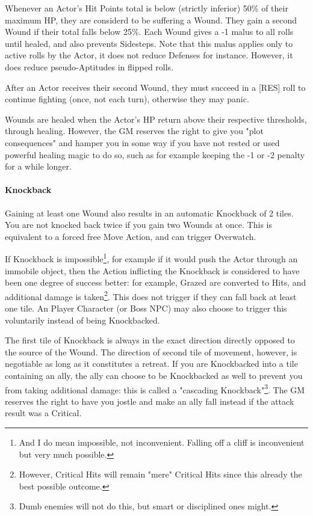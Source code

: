 Whenever an Actor's Hit Points total is below (strictly inferior) 50\% of their maximum HP, they are considerd to be suffering a Wound. They gain a second Wound if their total falls below 25\%. Each Wound gives a -1 malus to all rolls until healed, and also prevents Sidesteps. Note that this malus applies only to active rolls by the Actor, it does not reduce Defenses for instance. However, it does reduce pseudo-Aptitudes in flipped rolls.

After an Actor receives their second Wound, they must succeed in a [RES] roll to continue fighting (once, not each turn), otherwise they may panic. 

Wounds are healed when the Actor's HP return above their respective thresholds, through healing. However, the GM reserves the right to give you "plot consequences" and hamper you in some way if you have not rested or used powerful healing magic to do so, such as for example keeping the -1 or -2 penalty for a while longer.

\paragraph{Knockback}

Gaining at least one Wound also results in an automatic Knockback of 2 tiles. You are not knocked back twice if you gain two Wounds at once. This is equivalent to a forced free Move Action, and can trigger Overwatch. 

If Knockback is impossible\footnote{And I do mean impossible, not inconvenient. Falling off a cliff is inconvenient but very much possible.}, for example if it would push the Actor through an immobile object, then the Action inflicting the Knockback is considered to have been one degree of success better: for example, Grazed are converted to Hits, and additional damage is taken\footnote{However, Critical Hits will remain "mere" Critical Hits since this already the best possible outcome.}. This does not trigger if they can fall back at least one tile. An Player Character (or Boss NPC) may also choose to trigger this voluntarily instead of being Knockbacked.

The first tile of Knockback is always in the exact direction directly opposed to the source of the Wound. The direction of second tile of movement, however, is negotiable as long as it constitutes a retreat. If you are Knockbacked into a tile containing an ally, the ally can choose to be Knockbacked as well to prevent you from taking additional damage: this is called a "cascading Knockback"\footnote{Dumb enemies will not do this, but smart or disciplined ones might.}. The GM reserves the right to have you jostle and make an ally fall instead if the attack result was a Critical.


